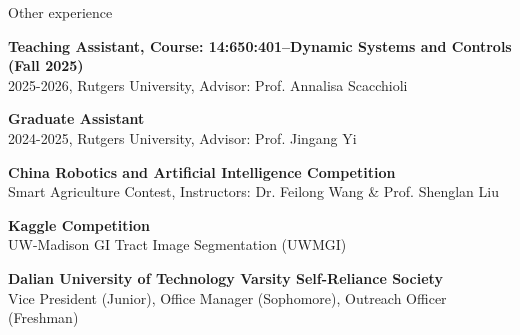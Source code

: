 \documentclass{resume} %
\begin{document}
\begin{rSection}{Other experience}

\begin{rSubsection}{}{}
	{}{}

\item {{\bf Teaching Assistant, Course: 14:650:401–Dynamic Systems and Controls (Fall 2025)}\\ 2025-2026, Rutgers University, Advisor: Prof. Annalisa Scacchioli}\\

\item {{\bf Graduate Assistant}\\ 2024-2025, Rutgers University, Advisor: Prof. Jingang Yi}\\

\item {{\bf China Robotics and Artificial Intelligence Competition}\\ Smart Agriculture Contest, Instructors: Dr. Feilong Wang \& Prof. Shenglan Liu}\\

\item {{\bf Kaggle Competition}\\UW-Madison GI Tract Image Segmentation (UWMGI)}\\

\item {{\bf Dalian University of Technology Varsity Self-Reliance Society}\\Vice President (Junior), Office Manager (Sophomore), Outreach Officer (Freshman)}\\
\end{rSubsection}

\end{rSection}


\end{document}
